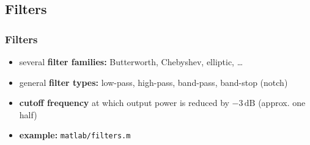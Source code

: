 
\subsection{Filters}

\begin{frame}
	\frametitle{Filters}
	\begin{itemize}
		\item several \textbf{filter families:} Butterworth, Chebyshev, elliptic, \ldots
		\item general \textbf{filter types:} low-pass, high-pass, band-pass, band-stop (notch)
		\item \textbf{cutoff frequency} at which output power is reduced by $-3\,\textrm{dB}$ (approx. one half)
		\item \textbf{example:} \texttt{matlab/filters.m}
			\begin{figure}
				\centering
				\begin{subfigure}[c]{0.48\linewidth}
				\end{subfigure}
				\hspace{0.01\linewidth}
				\begin{subfigure}[c]{0.48\linewidth}
				\end{subfigure}
			\end{figure}
	\end{itemize}
\end{frame}

